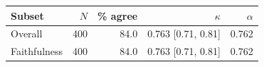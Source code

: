 \begin{tabular}{lrrrr}
\toprule
Subset & $N$ & \% agree & $\kappa$ & $\alpha$ \\
\midrule
Overall & 400 & 84.0 & 0.763 \tiny[0.71, 0.81] & 0.762 \\
\midrule
Faithfulness & 400 & 84.0 & 0.763 \tiny[0.71, 0.81] & 0.762 \\
\bottomrule
\end{tabular}
